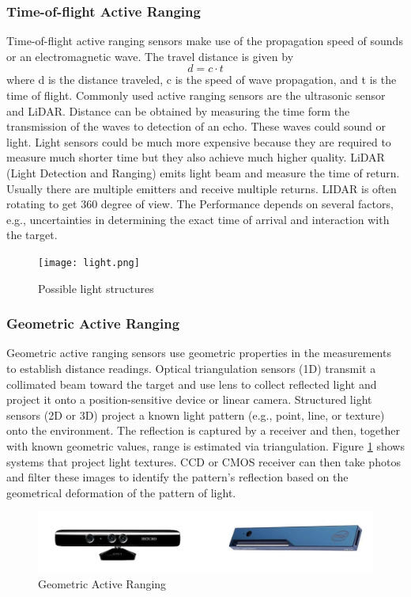 \subsubsection{Time-of-flight Active Ranging}
Time-of-flight active ranging sensors make use of the propagation speed of sounds or an electromagnetic wave. The travel distance is given by
$$d = c \cdot t$$
where d is the distance traveled, c is the speed of wave propagation, and t is the time of flight. Commonly used active ranging sensors are the ultrasonic sensor and LiDAR. Distance can be obtained by measuring the time form the transmission of the waves to detection of an echo. These waves could sound or light. Light sensors could be much more expensive because they are required to measure much shorter time but they also achieve much higher quality. LiDAR (Light Detection and Ranging) emits light beam and measure the time of return. Usually there are multiple emitters and receive multiple returns. LIDAR is often rotating to get 360 degree of view. The Performance depends on several factors, e.g., uncertainties in determining the exact time of arrival and interaction with the target.
\begin{figure}
\centering
\texttt{[image: light.png]}
\caption{Possible light structures \cite{SNS}}
\label{fig:3D_light}
\end{figure}


\subsubsection{Geometric Active Ranging}
Geometric active ranging sensors use geometric properties in the measurements to establish distance readings. Optical triangulation sensors (1D) transmit a collimated beam toward the target and use lens to collect reflected light and project it onto a position-sensitive device or linear camera. Structured light sensors (2D or 3D) project a known light pattern (e.g., point, line, or texture) onto the environment. The reflection is captured by a receiver and then, together with known geometric values, range is estimated via triangulation. Figure \ref{fig:3D_light} shows systems that project light textures. CCD or CMOS receiver can then take photos and filter these images to identify the pattern’s reflection based on the geometrical deformation of the pattern of light.
\begin{figure}[H]
\centering
        \includegraphics[width =12 cm]{lecture_4/imgs/geometric.png}
        \caption{Geometric Active Ranging}
\end{figure}
